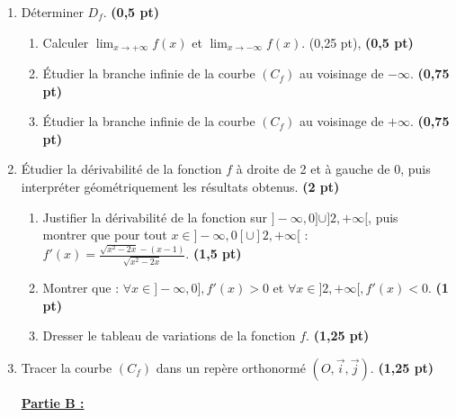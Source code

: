\documentclass[12pt,a4paper]{article}
\begin{document}
\begin{enumerate}
\item  Déterminer \( D_f \). \hspace{1cm} \textbf{(0,5 pt)}

\begin{enumerate}
    \item Calculer \( \lim_{x \to +\infty} f(x) \) et \( \lim_{x \to -\infty} f(x) \). \hspace{1cm} (0,25 pt), \textbf{(0,5 pt)}
    \item Étudier la branche infinie de la courbe \( (C_f) \) au voisinage de \( -\infty \). \hspace{1cm} \textbf{(0,75 pt)}
    \item Étudier la branche infinie de la courbe \( (C_f) \) au voisinage de \( +\infty \). \hspace{1cm} \textbf{(0,75 pt)}
\end{enumerate}

\item Étudier la dérivabilité de la fonction \( f \) à droite de 2 et à gauche de 0, puis interpréter géométriquement les résultats obtenus. \hspace{1cm} \textbf{(2 pt)}

\begin{enumerate}
    \item Justifier la dérivabilité de la fonction sur \( ]-\infty, 0] \cup ]2, +\infty[ \), puis\\ montrer que pour tout \( x \in ]-\infty, 0[ \cup ]2, +\infty[ \) :
    \(
    f'(x) = \frac{\sqrt{x^2 - 2x} - (x - 1)}{\sqrt{x^2 - 2x}}.
    \)    \hspace{1cm} \textbf{(1,5 pt)}

    
    \item Montrer que : \( \forall x \in ]-\infty, 0], f'(x) > 0 \) et \( \forall x \in ]2, +\infty[, f'(x) < 0 \). \hspace{1cm} \textbf{(1 pt)}
    
    \item Dresser le tableau de variations de la fonction \( f \). \hspace{1cm} \textbf{(1,25 pt)}
\end{enumerate}

\item Tracer la courbe \( (C_f) \) dans un repère orthonormé \( (O, \vec{i}, \vec{j}) \). \hspace{1cm} \textbf{(1,25 pt)}

\underline{\textbf{Partie B :}}


\end{enumerate}
\end{document}
